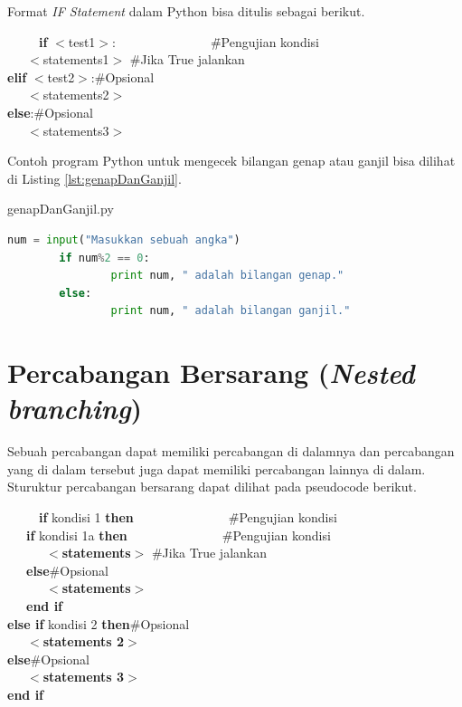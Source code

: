 Format \textit{IF Statement} dalam Python bisa ditulis sebagai berikut.

\begin{tabbing}
~~~~~\=\textbf{if} $<$test1$>$:~~~~~~~~~~~~~~~\=\#Pengujian kondisi\\
\>~~~$<$statements1$>$ \> \#Jika True jalankan\\
\>\textbf{elif} $<$test2$>$:\>\#Opsional\\
\>~~~$<$statements2$>$\>\\
\>\textbf{else}:\>\#Opsional\\
\>~~~$<$statements3$>$\>\\
\end{tabbing}

Contoh program Python untuk mengecek bilangan genap atau ganjil bisa dilihat di Listing \ref{lst:genapDanGanjil}.

\begin{listprog}{genapDanGanjil.py}
	\label{lst:genapDanGanjil}
	\begin{lstlisting}[language=Python]
		num = input("Masukkan sebuah angka")
		if num%2 == 0:
				print num, " adalah bilangan genap."
		else:
				print num, " adalah bilangan ganjil."
	\end{lstlisting}
\end{listprog}


\section{Percabangan Bersarang (\textit{Nested branching})}
Sebuah percabangan dapat memiliki percabangan di dalamnya dan percabangan yang di dalam tersebut juga dapat memiliki percabangan lainnya di dalam. Sturuktur percabangan bersarang dapat dilihat pada pseudocode berikut.

\begin{tabbing}
~~~~~\=\textbf{if} kondisi 1 \textbf{then}~~~~~~~~~~~~~~~\=\#Pengujian kondisi\\
\>~~~\textbf{if} kondisi 1a \textbf{then}~~~~~~~~~~~~~~~\=\#Pengujian kondisi\\
\>~~~~~~$<$\textbf{statements}$>$ \> \#Jika True jalankan\\
\>~~~\textbf{else}\>\#Opsional\\
\>~~~~~~$<$\textbf{statements}$>$\>\\
\>~~~\textbf{end if}\\
\>\textbf{else if } kondisi 2 \textbf{then}\>\#Opsional\\
\>~~~$<$\textbf{statements 2}$>$\>\\
\>\textbf{else}\>\#Opsional\\
\>~~~$<$\textbf{statements 3}$>$\>\\
\>\textbf{end if}
\end{tabbing}

